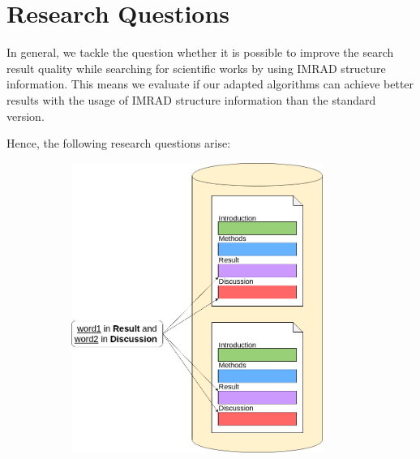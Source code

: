 
\section{Research Questions}
\label{sec:research_questions}

In general, we tackle the question whether it is possible to improve the search result quality while searching for scientific works by using IMRAD structure information. This means we evaluate if our adapted algorithms can achieve better results with the usage of IMRAD structure information than the standard version.

Hence, the following research questions arise:

\begin{figure}[t]
  \begin{subfigure}[c]{0.49\textwidth}
    \includegraphics[width=0.9\textwidth]{figures/explicit}
  \end{subfigure}
  \begin{subfigure}[c]{0.49\textwidth}

\end{subfigure}
\end{figure}
